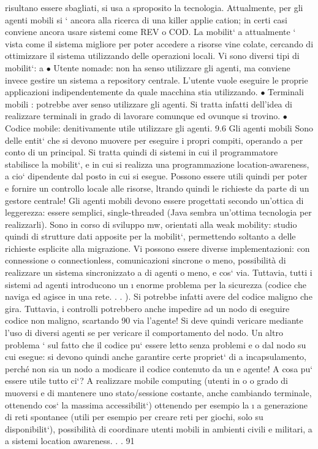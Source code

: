\documentclass[a4paper,12pt]{article}
\begin{document}
risultano essere sbagliati, si usa a sproposito la tecnologia.
Attualmente, per gli agenti mobili si ` ancora alla ricerca di una killer applie
cation; in certi casi conviene ancora usare sistemi come REV o COD. La mobilit`
a
attualmente ` vista come il sistema migliore per poter accedere a risorse vine
colate, cercando di ottimizzare il sistema utilizzando delle operazioni locali. Vi
sono diversi tipi di mobilit`:
a
$\bullet$ Utente nomade: non ha senso utilizzare gli agenti, ma conviene invece
gestire un sistema a repository centrale. L'utente vuole eseguire le proprie
applicazioni indipendentemente da quale macchina stia utilizzando.
$\bullet$ Terminali mobili : potrebbe aver senso utilizzare gli agenti. Si tratta infatti
dell'idea di realizzare terminali in grado di lavorare comunque ed ovunque
si trovino.
$\bullet$ Codice mobile: denitivamente utile utilizzare gli agenti.
9.6
Gli agenti mobili
Sono delle entit` che si devono muovere per eseguire i propri compiti, operando
a
per conto di un principal. Si tratta quindi di sistemi in cui il programmatore stabilisce la mobilit`, e in cui si
realizza una programmazione location-awareness,
a
cio` dipendente dal posto in cui si esegue. Possono essere utili quindi per poter
e
fornire un controllo locale alle risorse, ltrando quindi le richieste da parte di un
gestore centrale! Gli agenti mobili devono essere progettati secondo un'ottica di
leggerezza: essere semplici, single-threaded (Java sembra un'ottima tecnologia
per realizzarli). Sono in corso di sviluppo mw, orientati alla weak mobility:
studio quindi di strutture dati apposite per la mobilit`, permettendo soltanto
a
delle richieste esplicite alla migrazione.
Vi possono essere diverse implementazioni: con connessione o connectionless,
comunicazioni sincrone o meno, possibilità di realizzare un sistema sincronizzato
a
di agenti o meno, e cos` via. Tuttavia, tutti i sistemi ad agenti introducono un
\i{}
enorme problema per la sicurezza (codice che naviga ed agisce in una rete. . . ). Si
potrebbe infatti avere del codice maligno che gira. Tuttavia, i controlli potrebbero anche impedire ad un nodo di
eseguire codice non maligno, scartando
90
via l'agente! Si deve quindi vericare mediante l'uso di diversi agenti se per
vericare il comportamento del nodo.
Un altro problema ` sul fatto che il codice pu` essere letto senza problemi
e
o
dal nodo su cui esegue: si devono quindi anche garantire certe propriet` di
a
incapsulamento, perché non sia un nodo a modicare il codice contenuto da un
e
agente!
A cosa pu` essere utile tutto ci`? A realizzare mobile computing (utenti in
o
o
grado di muoversi e di mantenere uno stato/sessione costante, anche cambiando
terminale, ottenendo cos` la massima accessibilit`) ottenendo per esempio la
\i{}
a
generazione di reti spontanee (utili per esempio per creare reti per giochi, solo su
disponibilit`), possibilità di coordinare utenti mobili in ambienti civili e militari,
a
a
sistemi location awareness. . .
91
\end{document}
